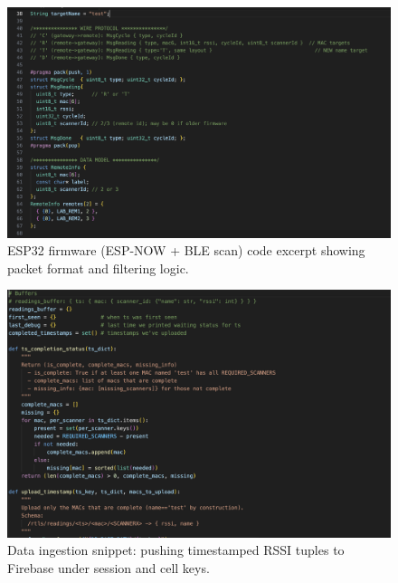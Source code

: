 \documentclass[a4paper,12pt]{report}
\begin{document}
\begin{figure}[H]
    \centering
    \includegraphics[width=\textwidth]{figures/esp32_firmware_code.png}
    \caption{ESP32 firmware (ESP-NOW + BLE scan) code excerpt showing packet format and filtering logic.}
    \label{fig:esp32_code}
\end{figure}

\begin{figure}[H]
    \centering
    \includegraphics[width=\textwidth]{figures/firebase_ingest_code.png}
    \caption{Data ingestion snippet: pushing timestamped RSSI tuples to Firebase under session and cell keys.}
    \label{fig:firebase_code}
\end{figure}
\end{document}
